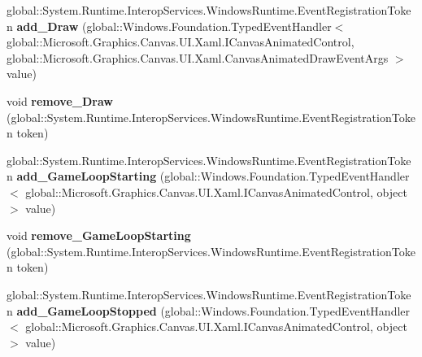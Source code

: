 \begin{DoxyCompactItemize}
\mbox{\label{class_microsoft_1_1_graphics_1_1_canvas_1_1_u_i_1_1_xaml_1_1_canvas_animated_control_afacf0f7ca405ccd98c5a6ae333a7fc12}} 
global\+::\+System.\+Runtime.\+Interop\+Services.\+Windows\+Runtime.\+Event\+Registration\+Token {\bfseries add\+\_\+\+Draw} (global\+::\+Windows.\+Foundation.\+Typed\+Event\+Handler$<$ global\+::\+Microsoft.\+Graphics.\+Canvas.\+U\+I.\+Xaml.\+I\+Canvas\+Animated\+Control, global\+::\+Microsoft.\+Graphics.\+Canvas.\+U\+I.\+Xaml.\+Canvas\+Animated\+Draw\+Event\+Args $>$ value)
\item 
\mbox{\label{class_microsoft_1_1_graphics_1_1_canvas_1_1_u_i_1_1_xaml_1_1_canvas_animated_control_a1c98ae37b09c9d6d53a47f8e303430ad}} 
void {\bfseries remove\+\_\+\+Draw} (global\+::\+System.\+Runtime.\+Interop\+Services.\+Windows\+Runtime.\+Event\+Registration\+Token token)
\item 
\mbox{\label{class_microsoft_1_1_graphics_1_1_canvas_1_1_u_i_1_1_xaml_1_1_canvas_animated_control_a1a3af8188976d58864922e96695f8eac}} 
global\+::\+System.\+Runtime.\+Interop\+Services.\+Windows\+Runtime.\+Event\+Registration\+Token {\bfseries add\+\_\+\+Game\+Loop\+Starting} (global\+::\+Windows.\+Foundation.\+Typed\+Event\+Handler$<$ global\+::\+Microsoft.\+Graphics.\+Canvas.\+U\+I.\+Xaml.\+I\+Canvas\+Animated\+Control, object $>$ value)
\item 
\mbox{\label{class_microsoft_1_1_graphics_1_1_canvas_1_1_u_i_1_1_xaml_1_1_canvas_animated_control_a45562438048578df83a897e93f9d1463}} 
void {\bfseries remove\+\_\+\+Game\+Loop\+Starting} (global\+::\+System.\+Runtime.\+Interop\+Services.\+Windows\+Runtime.\+Event\+Registration\+Token token)
\item 
\mbox{\label{class_microsoft_1_1_graphics_1_1_canvas_1_1_u_i_1_1_xaml_1_1_canvas_animated_control_a588a0abe17bd1d9b2363fef5d6a6acac}} 
global\+::\+System.\+Runtime.\+Interop\+Services.\+Windows\+Runtime.\+Event\+Registration\+Token {\bfseries add\+\_\+\+Game\+Loop\+Stopped} (global\+::\+Windows.\+Foundation.\+Typed\+Event\+Handler$<$ global\+::\+Microsoft.\+Graphics.\+Canvas.\+U\+I.\+Xaml.\+I\+Canvas\+Animated\+Control, object $>$ value)

\end{DoxyCompactItemize}
